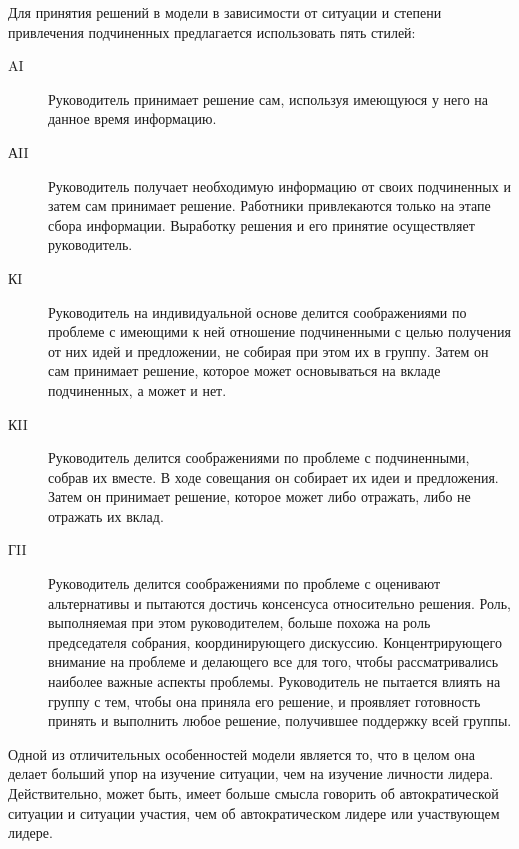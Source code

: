 \documentclass[a4paper,12pt,oneside,final]{extarticle}
\numberwithin{equation}{section}
\begin{document}
\begin{enumerate}
Для принятия решений в модели в зависимости от ситуации и степени привлечения подчиненных предлагается использовать пять стилей: 
\begin{description}
	\item[AI] Руководитель принимает решение сам, используя имеющуюся у него на данное время информацию.
	\item[АII] Руководитель получает необходимую информацию от своих подчиненных и затем сам принимает решение. 
	Работники привлекаются только на этапе сбора информации. 
	Выработку решения и его принятие осуществляет руководитель.
	\item[КI] Руководитель на индивидуальной основе делится соображениями по проблеме с имеющими к ней отношение подчиненными с целью получения от них идей и предложении, не собирая при этом их в группу. 
	Затем он сам принимает решение, которое может основываться на вкладе подчиненных, а может и нет.
	\item[КII] Руководитель делится соображениями по проблеме с подчиненными, собрав их вместе. 
	В ходе совещания он собирает их идеи и предложения. 
	Затем он принимает решение, которое может либо отражать, либо не отражать их вклад.
	\item[ГII] Руководитель делится соображениями по проблеме с оценивают альтернативы и пытаются достичь консенсуса относительно решения. 
	Роль, выполняемая при этом руководителем, больше похожа на роль председателя собрания, координирующего дискуссию. 
	Концентрирующего внимание на проблеме и делающего все для того, чтобы рассматривались наиболее важные аспекты проблемы. 
	Руководитель не пытается влиять на группу с тем, чтобы она приняла его решение, и проявляет готовность принять и выполнить любое решение, получившее поддержку всей группы. 
\end{description}

Одной из отличительных особенностей модели является то, что в целом она делает больший упор на изучение ситуации, чем на изучение личности лидера.
Действительно, может быть, имеет больше смысла говорить об автократической ситуации и ситуации участия, чем об автократическом лидере или участвующем лидере.


\end{enumerate}
\end{document}
